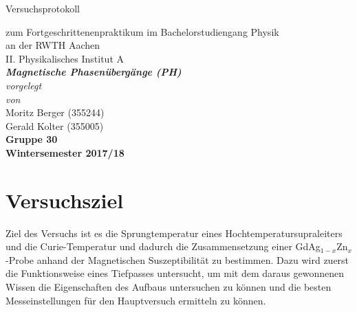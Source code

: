 \documentclass[12pt,a4paper]{article}
\author{Gerald}
\begin{document}
	\setlength{\parindent}{0pt} 
	\begin{center}
		{\LARGE Versuchsprotokoll}\\
		\begin{large}
			zum Fortgeschrittenenpraktikum im Bachelorstudiengang Physik\\[0.4cm]
			an der RWTH Aachen\\
			II. Physikalisches Institut A\\[5.5cm]
			\Large\textbf{\textsl{Magnetische Phasenübergänge (PH)}}\\[5.5cm]
			\normalsize\textit{vorgelegt\\von}\\[0.4cm]
			\large{Moritz Berger (355244)\\Gerald Kolter (355005)}\\\textbf{Gruppe 30}\\[2cm]
			\large \textbf{Wintersemester 2017/18}
		\end{large}
	\end{center}
	\newpage
	
	\tableofcontents
	\newpage

\section{Versuchsziel}
Ziel des Versuchs ist es die Sprungtemperatur eines Hochtemperatursupraleiters und die Curie-Temperatur und dadurch die Zusammensetzung einer GdAg$_{1-x}$Zn$_x$-Probe anhand der Magnetischen Suszeptibilität zu bestimmen. Dazu wird zuerst die Funktionsweise eines Tiefpasses untersucht, um mit dem daraus gewonnenen Wissen die Eigenschaften des Aufbaus untersuchen zu können und die besten Messeinstellungen für den Hauptversuch ermitteln zu können.
\end{document}
